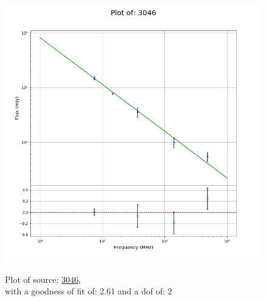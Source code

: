 \documentclass{article}
\begin{document}
\begin{figure}[H]
    \centering
    \begin{minipage}{.5\textwidth}
        \centering
        \includegraphics[scale = 0.35]{KmeulenTrap4P23_1hr/1hr3046.png}
        \captionsetup{labelformat=empty}
        \caption{Plot of source: \href{http://banana.transientskp.org/r4/vlo_KmeulenTrap4P23/runningcatalog/3046}{3046},\\with a goodness of fit of: 2.61 and a dof of: 2}
        \addtocounter{figure}{-1}
        \label{KmeulenTrap4P23:1hr:3046:plot}
    \end{minipage}%
    \begin{minipage}{0.5\textwidth}
        \centering


\end{minipage}
\end{figure}
\end{document}
